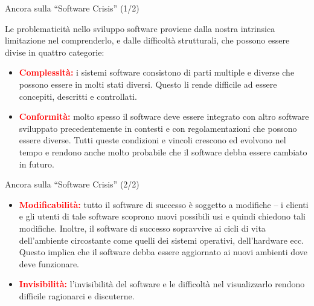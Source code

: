 \documentclass{beamer}
\begin{document}
\begin{frame}{\centerline{Ancora sulla ``Software Crisis'' (1/2)}}

Le problematicit\`{a} nello sviluppo software proviene dalla nostra intrinsica limitazione nel comprenderlo, e dalle difficolt\`{a} strutturali, che possono essere divise in quattro categorie:
\begin{itemize}
\item \textcolor{red}{\bf Complessit\`{a}:} i sistemi software consistono di parti multiple e diverse che possono essere in molti stati diversi. Questo li rende difficile ad essere concepiti, descritti e controllati.

\item \textcolor{red}{\bf Conformit\`{a}:} molto spesso il software deve essere integrato con altro software sviluppato precedentemente in contesti e con regolamentazioni che possono essere diverse. Tutti queste condizioni e vincoli crescono ed evolvono nel tempo e rendono anche molto probabile che il software debba essere cambiato in futuro.
\end{itemize}

\end{frame}

\begin{frame}{\centerline{Ancora sulla ``Software Crisis'' (2/2)}}

\begin{itemize}
\item \textcolor{red}{\bf Modificabilit\`{a}:} tutto il software di successo \`{e} soggetto a modifiche -- i clienti e gli utenti di tale software scoprono nuovi possibili usi e quindi chiedono tali modifiche. Inoltre, il software di successo sopravvive ai cicli di vita dell'ambiente circostante come quelli dei sistemi operativi, dell'hardware ecc. Questo implica che il software debba essere aggiornato ai nuovi ambienti dove deve funzionare. 

\item \textcolor{red}{\bf Invisibilit\`{a}:} l'invisibilit\`{a} del software e le difficolt\`{a} nel visualizzarlo rendono difficile ragionarci e discuterne.

\end{itemize}
\end{frame}
\end{document}
